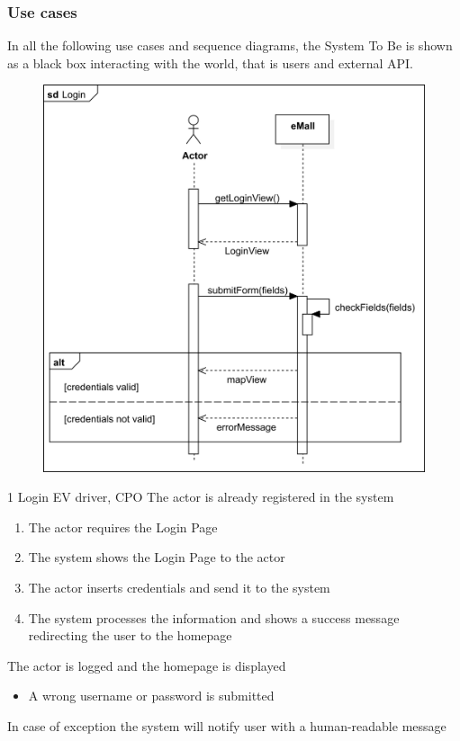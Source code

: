 \pagebreak

\subsubsection{Use cases}
In all the following use cases and sequence diagrams, the System To Be is shown as a black box interacting with the world, that is users and external API.
\usecase
{
    \begin{figure}[H]
        \centering
        \includegraphics[scale=0.9]{src/sequence_diagram/login.png}
    \end{figure}
}
{1}
{Login}
{EV driver, CPO}
{The actor is already registered in the system}
{
    \begin{enumerate}
        \item The actor requires the Login Page
        \item The system shows the Login Page to the actor
        \item The actor inserts credentials and send it to the system
        \item The system processes the information and shows a success message redirecting the user to the homepage
    \end{enumerate}
}
{The actor is logged and the homepage is displayed}
{
    \begin{itemize}
        \item A wrong username or password is submitted
    \end{itemize}
}
{
    In case of exception the system will notify user with a human-readable message
}


